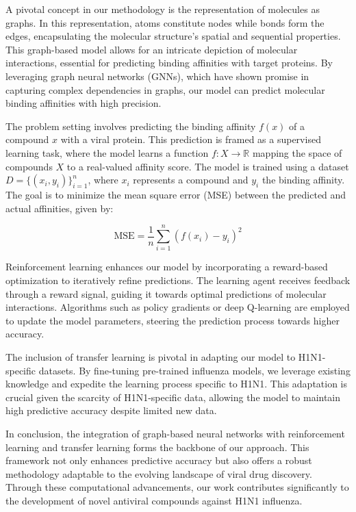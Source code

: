 \documentclass{article}
\begin{document}
A pivotal concept in our methodology is the representation of molecules as graphs. In this representation, atoms constitute nodes while bonds form the edges, encapsulating the molecular structure's spatial and sequential properties. This graph-based model allows for an intricate depiction of molecular interactions, essential for predicting binding affinities with target proteins. By leveraging graph neural networks (GNNs), which have shown promise in capturing complex dependencies in graphs, our model can predict molecular binding affinities with high precision.

The problem setting involves predicting the binding affinity \( f(x) \) of a compound \( x \) with a viral protein. This prediction is framed as a supervised learning task, where the model learns a function \( f: X \rightarrow \mathbb{R} \) mapping the space of compounds \( X \) to a real-valued affinity score. The model is trained using a dataset \( D = \{(x_i, y_i)\}_{i=1}^n \), where \( x_i \) represents a compound and \( y_i \) the binding affinity. The goal is to minimize the mean square error (MSE) between the predicted and actual affinities, given by:

\[
\text{MSE} = \frac{1}{n} \sum_{i=1}^{n} (f(x_i) - y_i)^2
\]

Reinforcement learning enhances our model by incorporating a reward-based optimization to iteratively refine predictions. The learning agent receives feedback through a reward signal, guiding it towards optimal predictions of molecular interactions. Algorithms such as policy gradients or deep Q-learning are employed to update the model parameters, steering the prediction process towards higher accuracy.

The inclusion of transfer learning is pivotal in adapting our model to H1N1-specific datasets. By fine-tuning pre-trained influenza models, we leverage existing knowledge and expedite the learning process specific to H1N1. This adaptation is crucial given the scarcity of H1N1-specific data, allowing the model to maintain high predictive accuracy despite limited new data.

In conclusion, the integration of graph-based neural networks with reinforcement learning and transfer learning forms the backbone of our approach. This framework not only enhances predictive accuracy but also offers a robust methodology adaptable to the evolving landscape of viral drug discovery. Through these computational advancements, our work contributes significantly to the development of novel antiviral compounds against H1N1 influenza.
\end{document}
